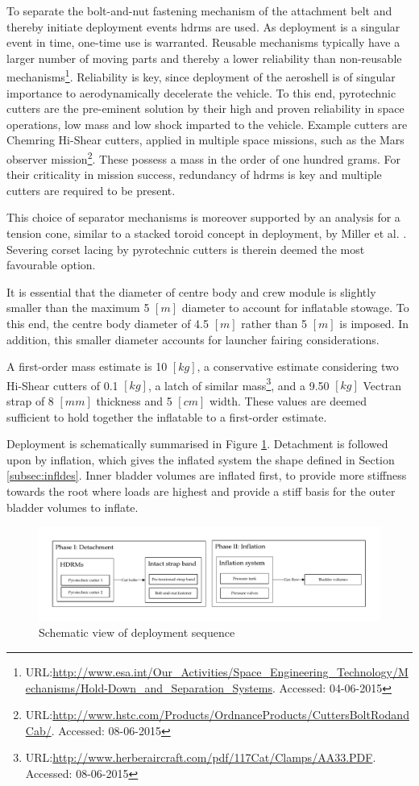 To separate the bolt-and-nut fastening mechanism of the attachment belt and thereby initiate deployment events \glspl{hdrm} are used. As deployment is a singular event in time, one-time use is warranted. Reusable mechanisms typically have a larger number of moving parts and thereby a lower reliability than non-reusable mechanisms\footnote{URL:\url{http://www.esa.int/Our_Activities/Space_Engineering_Technology/Mechanisms/Hold-Down_and_Separation_Systems}. Accessed: 04-06-2015}. Reliability is key, since deployment of the aeroshell is of singular importance to aerodynamically decelerate the vehicle. To this end, pyrotechnic cutters are the pre-eminent solution by their high and proven reliability in space operations, low mass and low shock imparted to the vehicle. Example cutters are Chemring Hi-Shear cutters, applied in multiple space missions, such as the Mars observer mission\footnote{URL:\url{http://www.hstc.com/Products/OrdnanceProducts/CuttersBoltRodandCab/}. Accessed: 08-06-2015}. These possess a mass in the order of one hundred grams. For their criticality in mission success, redundancy of \glspl{hdrm} is key and multiple cutters are required to be present. 

This choice of separator mechanisms is moreover supported by an analysis for a tension cone, similar to a stacked toroid concept in deployment, by Miller et al. \cite{Miller2014}. Severing corset lacing by pyrotechnic cutters is therein deemed the most favourable option.


It is essential that the diameter of centre body and crew module is slightly smaller than the maximum 5 $[m]$ diameter to account for inflatable stowage. To this end, the centre body diameter of 4.5 $[m]$ rather than 5 $[m]$ is imposed. In addition, this smaller diameter accounts for launcher fairing considerations.


A first-order mass estimate is 10 $[kg]$, a conservative estimate considering two Hi-Shear cutters of 0.1 $[kg]$, a latch of similar mass\footnote{URL:\url{http://www.herberaircraft.com/pdf/117Cat/Clamps/AA33.PDF}. Accessed: 08-06-2015}, and a 9.50 $[kg]$ Vectran strap of 8 $[mm]$ thickness and 5 $[cm]$ width. These values are deemed sufficient to hold together the inflatable to a first-order estimate.

Deployment is schematically summarised in Figure \ref{fig:deplflow}. Detachment is followed upon by inflation, which gives the inflated system the shape defined in Section \ref{subsec:infldes}. Inner bladder volumes are inflated first, to provide more stiffness towards the root where loads are highest and provide a stiff basis for the outer bladder volumes to inflate.

\begin{figure}[h]
		\centering
		\includegraphics[width=1.0\textwidth]{./Figure/Structure/Deployment.pdf}
		\caption{Schematic view of deployment sequence}
		\label{fig:deplflow}
\end{figure}